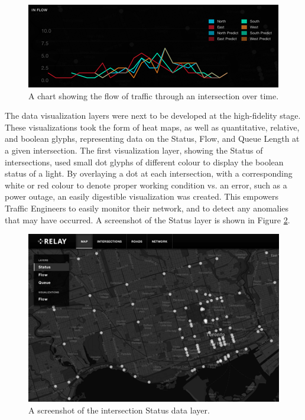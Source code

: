 \documentclass{report}
\begin{document}
\begin{figure}[htbp!]
  \begin{centering}
    \includegraphics[scale=0.9]{figures/chart.png}
    \caption{A chart showing the flow of traffic through an intersection over time.}
    \label{fig:chart}
  \end{centering}
\end{figure}

The data visualization layers were next to be developed at the high-fidelity stage.
These visualizations took the form of heat maps, as well as quantitative, relative, and boolean glyphs, representing data on the Status, Flow, and Queue Length at a given intersection.
The first visualization layer, showing the Status of intersections, used small dot glyphs of different colour to display the boolean status of a light.
By overlaying a dot at each intersection, with a corresponding white or red colour to denote proper working condition vs. an error, such as a power outage, an easily digestible visualization was created.
This empowers Traffic Engineers to easily monitor their network, and to detect any anomalies that may have occurred.
A screenshot of the Status layer is shown in Figure \ref{fig:status}. \\

\begin{figure}[htbp!]
  \begin{centering}
    \includegraphics[scale=0.9]{figures/status.png}
    \caption{A screenshot of the intersection Status data layer.}
    \label{fig:status}
  \end{centering}
\end{figure}
\end{document}
